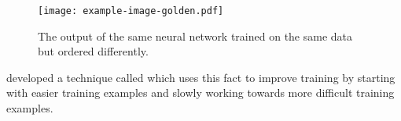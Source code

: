 \begin{figure}[htbp]
	\centering
	\texttt{[image: example-image-golden.pdf]}
	\caption{The output of the same neural network trained on the same data but ordered differently.}
	\label{fig:ann-order}
\end{figure}

\textcite{bengio2009} developed a technique called  which uses this fact to improve training by starting with easier training examples and slowly working towards more difficult training examples.

